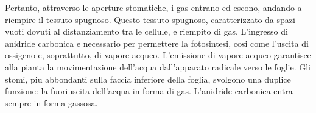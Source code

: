 \documentclass[11pt, a4paper]{article}
\begin{document}
\begin{spacing}{1}
Pertanto, attraverso le aperture stomatiche, i gas entrano ed escono, andando a riempire il tessuto spugnoso. Questo tessuto spugnoso, caratterizzato da spazi vuoti dovuti al distanziamento tra le cellule, e riempito di gas. L'ingresso di anidride carbonica e necessario per permettere la fotosintesi, cosi come l'uscita di ossigeno e, soprattutto, di vapore acqueo. L'emissione di vapore acqueo garantisce alla pianta la movimentazione dell'acqua dall'apparato radicale verso le foglie. Gli stomi, piu abbondanti sulla faccia inferiore della foglia, svolgono una duplice funzione: la fuoriuscita dell'acqua in forma di gas.
L'anidride carbonica entra sempre in forma gassosa.
\end{spacing}
\end{document}
